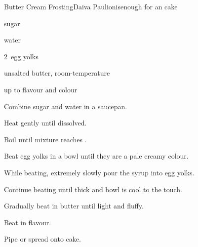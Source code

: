 \begin{recipe}{Butter Cream Frosting}{Daiva Paulionis}{enough for an  cake}

\begin{ingredients}
\item {} sugar
\item {} water
\item 2~egg yolks
\item {} unsalted butter, room-temperature
\item up to  flavour and colour
\end{ingredients}

\begin{directions}
\item Combine sugar and water in a saucepan.
\item Heat gently until dissolved.
\item Boil until mixture reaches .
\item Beat egg yolks in a bowl until they are a pale creamy colour.
\item While beating, extremely slowly pour the syrup into egg yolks.
\item Continue beating until thick and bowl is cool to the touch.
\item Gradually beat in butter until light and fluffy.
\item Beat in flavour.
\item Pipe or spread onto cake.
\end{directions}

\end{recipe}
